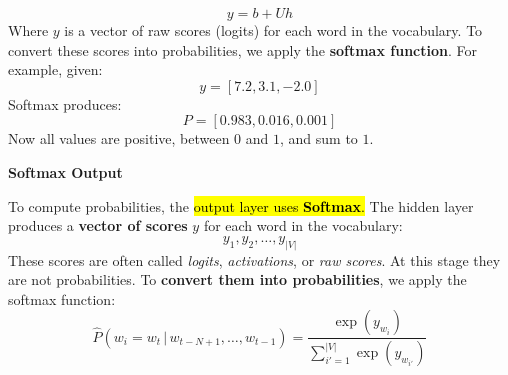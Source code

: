 \begin{equation*}
    y = b + U h
\end{equation*}
Where $y$ is a vector of raw scores (logits) for each word in the vocabulary. To convert these scores into probabilities, we apply the \textbf{softmax function}. For example, given:
\begin{equation*}
    y = \left[7.2, 3.1, -2.0\right]
\end{equation*}
Softmax produces:
\begin{equation*}
    P = \left[0.983, 0.016, 0.001\right]
\end{equation*}
Now all values are positive, between $0$ and $1$, and sum to $1$.

\newpage

\begin{flushleft}
    \textcolor{Green3}{ \textbf{Softmax Output}}
\end{flushleft}
To compute probabilities, the \hl{output layer uses \textbf{Softmax}.} The hidden layer produces a \textbf{vector of scores} $y$ for each word in the vocabulary:
\begin{equation*}
    y_1, y_2, \dots, y_{\left|V\right|}
\end{equation*}
These scores are often called \emph{logits}, \emph{activations}, or \emph{raw scores}. At this stage they are not probabilities. To \textbf{convert them into probabilities}, we apply the softmax function:
\begin{equation}
    \hat{P}\left(w_i = w_t \, | \, w_{t-N+1}, \dots, w_{t-1}\right) = \frac{\exp\left(y_{w_i}\right)}{\displaystyle\sum_{i'=1}^{\left|V\right|} \exp\left(y_{w_{i'}}\right)}
\end{equation}


